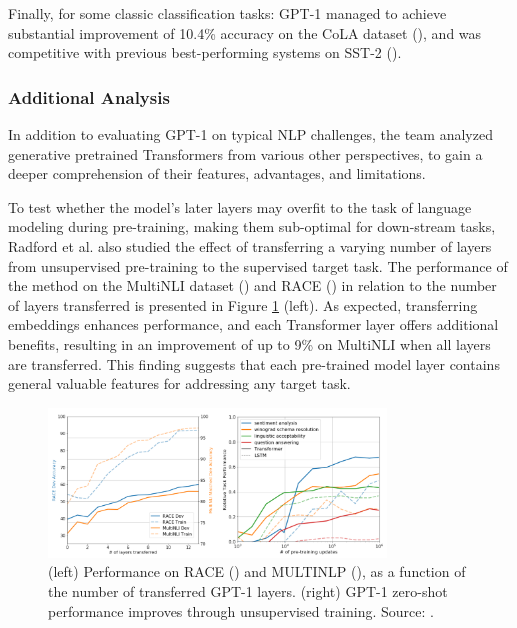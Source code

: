 \documentclass{article}
\begin{document}
\medskip
\noindent
Finally, for some classic classification tasks: GPT-1 managed to achieve substantial improvement of 10.4\% accuracy on the CoLA dataset (\citet{warstadt2019cola}), and was competitive with previous best-performing systems on SST-2 (\citet{socher2013sst}).


\subsubsection{Additional Analysis}
\label{subsec:gpt1-more}

In addition to evaluating GPT-1 on typical NLP challenges, the team analyzed generative pretrained Transformers from various other perspectives, to gain a deeper comprehension of their features, advantages, and limitations.

\medskip
\noindent
To test whether the model's later layers may overfit to the task of language modeling during pre-training, making them sub-optimal for down-stream tasks, Radford et al. also studied the effect of transferring a varying number of layers from unsupervised pre-training to the supervised target task. The performance of the method on the MultiNLI dataset (\citet{williams2017broad}) and RACE (\citet{lai2017race}) in relation to the number of layers transferred is presented in Figure \ref{fig:gpt1_fig2} (left). As expected, transferring embeddings enhances performance, and each Transformer layer offers additional benefits, resulting in an improvement of up to 9\% on MultiNLI when all layers are transferred. This finding suggests that each pre-trained model layer contains general valuable features for addressing any target task.

\begin{figure}[ht!]
    \begin{center}
        \includegraphics[width=0.8\textwidth]{figures/gpt1_fig2.png}
    \end{center}
    \caption{
        (left) Performance on RACE (\citet{lai2017race}) and MULTINLP (\citet{williams2017broad}), as a function of the number of transferred GPT-1 layers. (right) GPT-1 zero-shot performance improves through unsupervised training. Source: \citet{radford2018gpt1}.
    }
    \label{fig:gpt1_fig2}
\end{figure}
\end{document}
